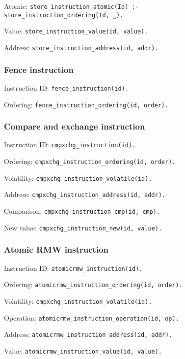 \noindent Atomic:
\texttt{store\_instruction\_atomic(Id) :- \\
        \tab store\_instruction\_ordering(Id, \_).}

\noindent Value:
\texttt{store\_instruction\_value(id, value).}

\noindent Address:
\texttt{store\_instruction\_address(id, addr).}


\subsubsection{Fence instruction}
Instruction ID:
\texttt{fence\_instruction(id).}

\noindent Ordering:
\texttt{fence\_instruction\_ordering(id, order).}


\subsubsection{Compare and exchange instruction}
Instruction ID:
\texttt{cmpxchg\_instruction(id).}

\noindent Ordering:
\texttt{cmpxchg\_instruction\_ordering(id, order).}

\noindent Volatility:
\texttt{cmpxchg\_instruction\_volatile(id).}

\noindent Address:
\texttt{cmpxchg\_instruction\_address(id, addr).}

\noindent Comparison:
\texttt{cmpxchg\_instruction\_cmp(id, cmp).}

\noindent New value:
\texttt{cmpxchg\_instruction\_new(id, value).}


\subsubsection{Atomic RMW instruction}
Instruction ID:
\texttt{atomicrmw\_instruction(id).}

\noindent Ordering:
\texttt{atomicrmw\_instruction\_ordering(id, order).}

\noindent Volatility:
\texttt{cmpxchg\_instruction\_volatile(id).}

\noindent Operation:
\texttt{atomicrmw\_instruction\_operation(id, op).}

\noindent Address:
\texttt{atomicrmw\_instruction\_address(id, addr).}

\noindent Value:
\texttt{atomicrmw\_instruction\_value(id, value).}

